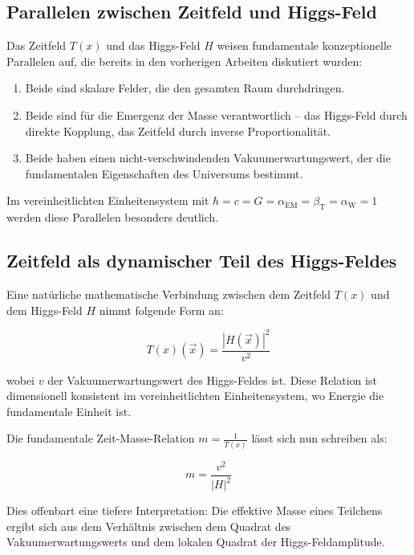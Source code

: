 \documentclass[12pt,a4paper]{article}
\newcommand{\Tfield}{T(x)}
\newcommand{\betaT}{\beta_{\text{T}}}
\newcommand{\alphaEM}{\alpha_{\text{EM}}}
\newcommand{\alphaW}{\alpha_{\text{W}}}
\newcommand{\vecx}{\vec{x}}
\begin{document}
	\subsection{Parallelen zwischen Zeitfeld und Higgs-Feld}
	Das Zeitfeld \(\Tfield\) und das Higgs-Feld \(H\) weisen fundamentale konzeptionelle Parallelen auf, die bereits in den vorherigen Arbeiten \cite{pascher_alpha_2025, pascher_alphabeta_2025} diskutiert wurden:
	
	\begin{enumerate}
		\item Beide sind skalare Felder, die den gesamten Raum durchdringen.
		\item Beide sind für die Emergenz der Masse verantwortlich – das Higgs-Feld durch direkte Kopplung, das Zeitfeld durch inverse Proportionalität.
		\item Beide haben einen nicht-verschwindenden Vakuumerwartungswert, der die fundamentalen Eigenschaften des Universums bestimmt.
	\end{enumerate}
	
	Im vereinheitlichten Einheitensystem mit \(\hbar = c = G = \alphaEM = \betaT = \alphaW = 1\) werden diese Parallelen besonders deutlich.
	
	\subsection{Zeitfeld als dynamischer Teil des Higgs-Feldes}
	Eine natürliche mathematische Verbindung zwischen dem Zeitfeld \(\Tfield\) und dem Higgs-Feld \(H\) nimmt folgende Form an:
	
	\begin{equation}
		\Tfield(\vecx) = \frac{|H(\vecx)|^2}{v^2}
	\end{equation}
	
	wobei \(v\) der Vakuumerwartungswert des Higgs-Feldes ist. Diese Relation ist dimensionell konsistent im vereinheitlichten Einheitensystem, wo Energie die fundamentale Einheit ist.
	
	Die fundamentale Zeit-Masse-Relation \(m = \frac{1}{\Tfield}\) lässt sich nun schreiben als:
	
	\begin{equation}
		m = \frac{v^2}{|H|^2}
	\end{equation}
	
	Dies offenbart eine tiefere Interpretation: Die effektive Masse eines Teilchens ergibt sich aus dem Verhältnis zwischen dem Quadrat des Vakuumerwartungswerts und dem lokalen Quadrat der Higgs-Feldamplitude.
	
\end{document}
